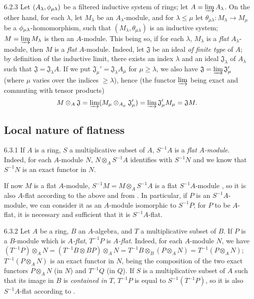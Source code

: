 \begin{env}{6.2.3}
\label{env-0.6.2.3}
Let $(A_\lambda,\phi_{\mu\lambda})$ be a filtered inductive system of rings; let
$A=\varinjlim A_\lambda$. On the other hand, for each $\lambda$, let $M_\lambda$ be an
$A_\lambda$-module, and for $\lambda\leqslant\mu$ let
$\theta_{\mu\lambda}:M_\lambda\to M_\mu$ be a $\phi_{\mu\lambda}$-homomorphism, such that
$(M_\lambda,\theta_{\mu\lambda})$ is an inductive system; $M=\varinjlim M_\lambda$ is then
an $A$-module. This being so, if for each $\lambda$, $M_\lambda$ is a \emph{flat}
$A_\lambda$-module, then $M$ is a \emph{flat} $A$-module. Indeed, let $\mathfrak{J}$ be an
ideal \emph{of finite type} of $A$; by definition of the inductive limit, there exists an
index $\lambda$ and an ideal $\mathfrak{J}_\lambda$ of $A_\lambda$ such that
$\mathfrak{J}=\mathfrak{J}_\lambda A$. If we put
$\mathfrak{J}_\mu'=\mathfrak{J}_\lambda A_\mu$ for $\mu\geqslant\lambda$, we also have
$\mathfrak{J}=\varinjlim\mathfrak{J}_\mu'$ (where $\mu$ varies over the indices
$\geqslant\lambda$), hence (the functor $\varinjlim$ being exact and commuting with tensor
products)
\[
  M\otimes_A\mathfrak{J}=\varinjlim(M_\mu\otimes_{A_\mu}\mathfrak{J}_\mu')
  =\varinjlim\mathfrak{J}_\mu'M_\mu=\mathfrak{J}M.
\]
\end{env}

\subsection{Local nature of flatness}
\label{0-prelim-6.3}

\begin{env}{6.3.1}
\label{env-0.6.3.1}
If $A$ is a ring, $S$ a multiplicative subset of $A$, $S^{-1}A$ is a \emph{flat $A$-module}.
Indeed, for each $A$-module $N$, $N\otimes_A S^{-1}A$ identifies with $S^{-1}N$
 and we know  that $S^{-1}N$ is an exact functor in $N$.

If now $M$ is a flat $A$-module, $S^{-1}M=M\otimes_A S^{-1}A$ is a flat $S^{-1}A$-module
, so it is also $A$-flat according to the above and from .
In particular, if $P$ is an $S^{-1}A$-module, we can consider it as an $A$-module isomorphic
to $S^{-1}P$; for $P$ to be $A$-flat, it is necessary and sufficient that it is
$S^{-1}A$-flat.
\end{env}

\begin{env}{6.3.2}
\label{env-0.6.3.2}
Let $A$ be a ring, $B$ an $A$-algebra, and $T$ a multiplicative subset of $B$. If $P$ is
a $B$-module which is \emph{$A$-flat}, $T^{-1}P$ is \emph{$A$-flat}. Indeed, for each
$A$-module $N$, we have
$(T^{-1}P)\otimes_A N=(T^{-1}B\otimes B P)\otimes_A N=T^{-1}B\otimes_B(P\otimes_A N)
=T^{-1}(P\otimes_A N)$; $T^{-1}(P\otimes_A N)$ is an exact functor in $N$, being the
composition of the two exact functors $P\otimes_A N$ (in $N$) and $T^{-1}Q$ (in $Q$). If $S$
is a multiplicative subset of $A$ such that its image in $B$ is \emph{contained in $T$},
$T^{-1}P$ is equal to $S^{-1}(T^{-1}P)$, so it is also $S^{-1}A$-flat according to
.
\end{env}

